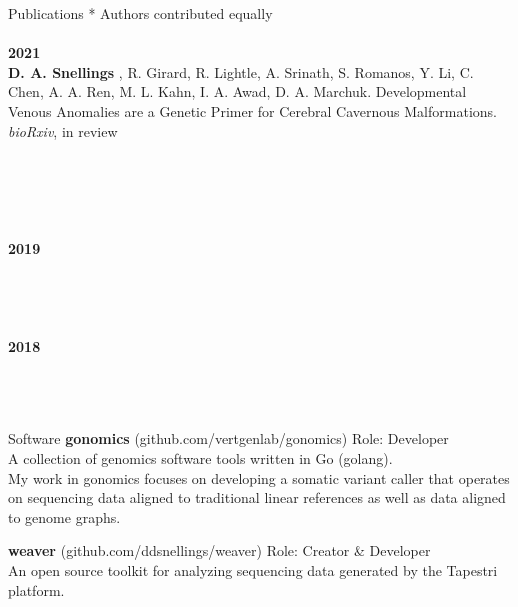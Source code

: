 \documentclass{resume} %
\begin{document}
\begin{rSection}{Publications}
{* Authors contributed equally}
%
\\ \\ {\bf 2021} 
\\ {\bf D. A. Snellings} , R. Girard, R. Lightle, A. Srinath, S. Romanos, Y. Li, C. Chen, A. A. Ren, M. L. Kahn, I. A. Awad, D. A. Marchuk.
Developmental Venous Anomalies are a Genetic Primer for Cerebral Cavernous Malformations. \textit{bioRxiv}, in review
\\
\\ 
\\
\\ 
%
\\ \\{\bf 2019} 
\\ 
\\
\\ 
%
\\ \\ {\bf 2018}
\\ 
\\
\\ 
\\
\end{rSection}


\begin{rSection}{Software}
{\bf gonomics} {(github.com/vertgenlab/gonomics)} \hfill{Role: Developer}
\\ {A collection of genomics software tools written in Go (golang).}
\\ {My work in gonomics focuses on developing a somatic variant caller that operates on sequencing data 
aligned to traditional linear references as well as data aligned to genome graphs.}

{\bf weaver} {(github.com/ddsnellings/weaver)} \hfill{Role: Creator \& Developer}
\\ {An open source toolkit for analyzing sequencing data generated by the Tapestri platform.}

\end{rSection}
\end{document}
